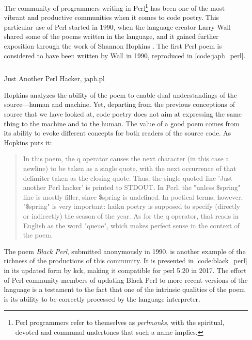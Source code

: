 The community of programmers writing in Perl\footnote{Perl programmers refer to themselves as \emph{perlmonks}, with the spiritual, devoted and communal undertones that such a name implies.} has been one of the most vibrant and productive communities when it comes to code poetry. This particular use of Perl started in 1990, when the language creator Larry Wall shared some of the poems written in the language, and it gained further exposition through the work of Shannon Hopkins \citep{hopkins_camels_1992}. The first Perl poem is considered to have been written by Wall in 1990, reproduced in \autoref{code:japh_perl}.

\begin{listing}
  \inputminted{perl}{./corpus/japh.pl}
  \caption{Just Another Perl Hacker, japh.pl}
  \label{code:japh_perl}
\end{listing}

Hopkins analyzes the ability of the poem to enable dual understandings of the source—human and machine. Yet, departing from the previous conceptions of source that we have looked at, code poetry does not aim at expressing the same thing to the machine and to the human. The value of a good poem comes from its ability to evoke different concepts for both readers of the source code. As Hopkins puts it:

\begin{quote}
  In this poem, the q operator causes the next character (in this case a newline) to be taken as a single quote, with the next occurrence of that delimiter taken as the closing quote. Thus, the single-quoted line 'Just another Perl hacker' is printed to STDOUT. In Perl, the "unless \$spring" line is mostly filler, since \$spring is undefined. In poetical terms, however, "\$spring" is very important: haiku poetry is supposed to specify (directly or indirectly) the season of the year. As for the q operator, that reads in English as the word "queue", which makes perfect sense in the context of the poem. \citep{hopkins_camels_1992}
\end{quote}

The poem \emph{Black Perl}, submitted anonymously in 1990, is another example of the richness of the productions of this community. It is presented in \autoref{code:black_perl} in its updated form by kck, making it compatible for perl 5.20 in 2017. The effort of Perl community members of updating Black Perl to more recent versions of the language is a testament to the fact that one of the intrinsic qualities of the poem is its ability to be correctly processed by the language interpreter.

